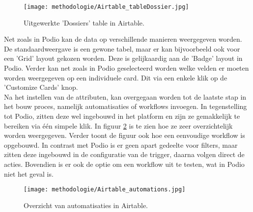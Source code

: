 \begin{figure}[h]
    \centering
    \texttt{[image: methodologie/Airtable\_tableDossier.jpg]}
    \caption{Uitgewerkte 'Dossiers' table in Airtable.}
    \label{fig:meth_airtable_dossiersTable}
\end{figure}

Net zoals in Podio kan de data op verschillende manieren weergegeven worden. De standaardweergave is een gewone tabel, maar er kan bijvoorbeeld ook voor een 'Grid' layout gekozen worden. Deze is gelijkaardig aan de 'Badge' layout in Podio. Verder kan net zoals in Podio geselecteerd worden welke velden er moeten worden weergegeven op een individuele card. Dit via een enkele klik op de 'Customize Cards' knop. \\

Na het instellen van de attributen, kan overgegaan worden tot de laatste stap in het bouw proces, namelijk automatisaties of workflows invoegen. In tegenstelling tot Podio, zitten deze wel ingebouwd in het platform en zijn ze gemakkelijk te bereiken via één simpele klik. In figuur \ref{fig:meth_airtable_automations} is te zien hoe ze zeer overzichtelijk worden weergegeven. Verder toont de figuur ook hoe een eenvoudige workflow is opgebouwd. In contrast met Podio is er geen apart gedeelte voor filters, maar zitten deze ingebouwd in de configuratie van de trigger,  daarna volgen direct de acties. Bovendien is er ook de optie om een workflow uit te testen, wat in Podio niet het geval is. \\

\begin{figure}[h]
    \centering
    \texttt{[image: methodologie/Airtable\_automations.jpg]}
    \caption{Overzicht van automatisaties in Airtable.}
    \label{fig:meth_airtable_automations}
\end{figure}


